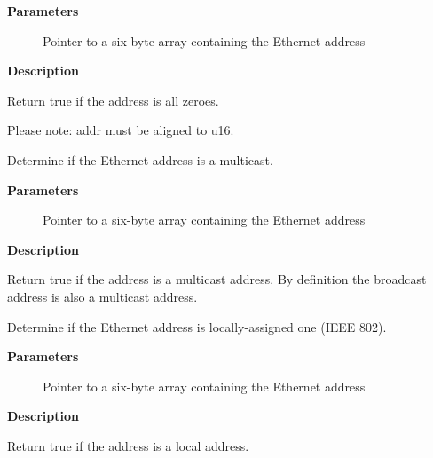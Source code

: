 \documentclass[a4paper,8pt,english]{sphinxmanual}
\begin{document}
\textbf{Parameters}
\begin{description}
\item[{}] \leavevmode
Pointer to a six-byte array containing the Ethernet address

\end{description}

\textbf{Description}

Return true if the address is all zeroes.

Please note: addr must be aligned to u16.

\begin{fulllineitems}
\label{networking/kapi:c.is_multicast_ether_addr}
Determine if the Ethernet address is a multicast.

\end{fulllineitems}


\textbf{Parameters}
\begin{description}
\item[{}] \leavevmode
Pointer to a six-byte array containing the Ethernet address

\end{description}

\textbf{Description}

Return true if the address is a multicast address.
By definition the broadcast address is also a multicast address.

\begin{fulllineitems}
\label{networking/kapi:c.is_local_ether_addr}
Determine if the Ethernet address is locally-assigned one (IEEE 802).

\end{fulllineitems}


\textbf{Parameters}
\begin{description}
\item[{}] \leavevmode
Pointer to a six-byte array containing the Ethernet address

\end{description}

\textbf{Description}

Return true if the address is a local address.
\end{document}
